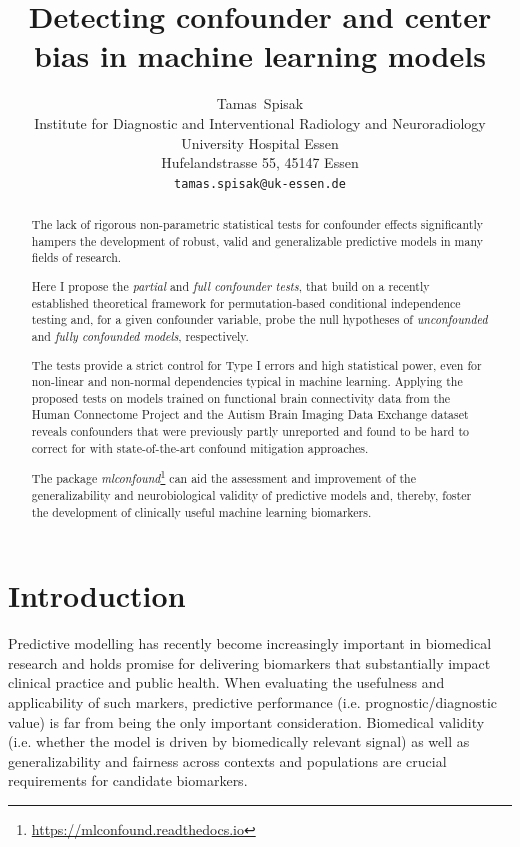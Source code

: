 \documentclass{article}
\title{Detecting confounder and center bias in machine learning models}
\author{
  Tamas~Spisak \\
  Institute for Diagnostic and Interventional Radiology and Neuroradiology \\
  University Hospital Essen\\
  Hufelandstrasse 55, 45147 Essen \\
  \texttt{tamas.spisak@uk-essen.de} \\
}
\begin{document}
\maketitle

\begin{abstract} %
The lack of rigorous non-parametric statistical tests for confounder effects significantly hampers the development of robust, valid and generalizable predictive models in many fields of research.

Here I propose the \emph{partial} and \emph{full confounder tests}, that build on a recently established theoretical framework for permutation-based conditional independence testing and, for a given confounder variable, probe the null hypotheses of \emph{unconfounded} and \emph{fully confounded models}, respectively.

The tests provide a strict control for Type I errors and high statistical power, even for non-linear and non-normal dependencies typical in machine learning.
Applying the proposed tests on models trained on functional brain connectivity data from the Human Connectome Project and the Autism Brain Imaging Data Exchange dataset reveals confounders that were previously partly unreported and found to be hard to correct for with state-of-the-art confound mitigation approaches.

The package \emph{mlconfound}\footnote{\href{https://mlconfound.readthedocs.io}{https://mlconfound.readthedocs.io}} can aid the assessment and improvement of the generalizability and neurobiological validity of predictive models and, thereby, foster the development of clinically useful machine learning biomarkers.
\end{abstract}



\section{Introduction}

Predictive modelling has recently become increasingly important in biomedical research and holds promise for delivering biomarkers that substantially impact clinical practice and public health\citep{kent2018personalized, spisak2020pain, walsh2021dome}. When evaluating the usefulness and applicability of such markers, predictive performance (i.e. prognostic/diagnostic value) is far from being the only important consideration. Biomedical validity (i.e. whether the model is driven by biomedically relevant signal) as well as generalizability and fairness across contexts and populations are crucial requirements for candidate biomarkers\citep{woo2017building, obermeyer2019dissecting, mehrabi2021survey}.
\end{document}
